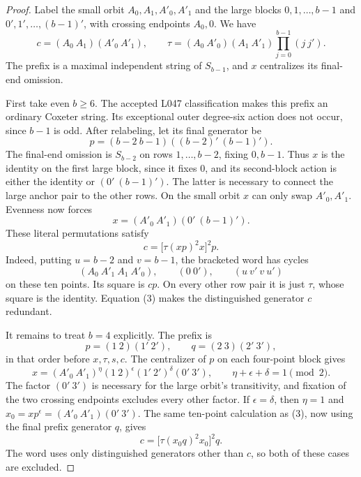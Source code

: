 \documentclass[11pt,a4paper]{article}
\begin{document}
\begin{proof}
Label the small orbit $A_0,A_1,A'_0,A'_1$ and the large
blocks $0,1,\ldots,b-1$ and $0',1',\ldots,(b-1)'$,
with crossing endpoints $A_0,0$. We have
\[
 c=(A_0\ A_1)(A'_0\ A'_1),\qquad
 \tau=(A_0\ A'_0)(A_1\ A'_1)
                  \prod_{j=0}^{b-1}(j\ j').                \tag{1}
\]
The prefix is a maximal independent string of $S_{b-1}$,
and $x$ centralizes its final-end omission.

First take even $b\geq6$. The accepted L047 classification
makes this prefix an ordinary Coxeter string. Its exceptional
outer degree-six action does not occur, since $b-1$ is odd.
After relabeling, let its final generator be
\[
 p=(b-2\ b-1)((b-2)'\ (b-1)').
\]
The final-end omission is $S_{b-2}$ on rows $1,\ldots,b-2$,
fixing $0,b-1$. Thus $x$ is the identity on the first large
block, since it fixes $0$, and its second-block action is
either the identity or $(0'\ (b-1)')$. The latter is necessary
to connect the large anchor pair to the other rows. On the
small orbit $x$ can only swap $A'_0,A'_1$. Evenness now forces
\[
                   x=(A'_0\ A'_1)(0'\ (b-1)').             \tag{2}
\]
These literal permutations satisfy
\[
                  c=\bigl[\tau(xp)^2x\bigr]^2p.           \tag{3}
\]
Indeed, putting $u=b-2$ and $v=b-1$, the bracketed word has
cycles
\[
 (A_0\ A'_1\ A_1\ A'_0),\qquad
 (0\ 0'),\qquad(u\ v'\ v\ u')
\]
on these ten points. Its square is $cp$. On every other row
pair it is just $\tau$, whose square is the identity.
Equation (3) makes the distinguished generator $c$ redundant.

It remains to treat $b=4$ explicitly. The prefix is
\[
 p=(1\ 2)(1'\ 2'),\qquad q=(2\ 3)(2'\ 3'),
\]
in that order before $x,\tau,s,c$. The centralizer of $p$
on each four-point block gives
\[
 x=(A'_0\ A'_1)^\eta(1\ 2)^\epsilon
                (1'\ 2')^\delta(0'\ 3'),\qquad
 \eta+\epsilon+\delta=1\pmod2.                            \tag{4}
\]
The factor $(0'\ 3')$ is necessary for the large orbit's
transitivity, and fixation of the two crossing endpoints
excludes every other factor. If $\epsilon=\delta$, then
$\eta=1$ and $x_0=xp^\epsilon=(A'_0\ A'_1)(0'\ 3')$.
The same ten-point calculation as (3), now using the final
prefix generator $q$, gives
\[
                  c=\bigl[\tau(x_0q)^2x_0\bigr]^2q.       \tag{5}
\]
The word uses only distinguished generators other than $c$,
so both of these cases are excluded.


\end{proof}
\end{document}
